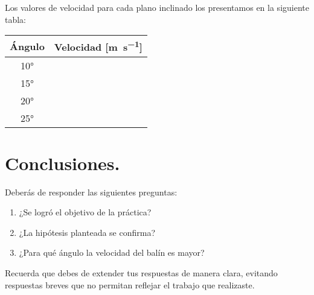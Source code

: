 \documentclass[14pt]{extarticle}
\begin{document}
Los valores de velocidad para cada plano inclinado los presentamos en la siguiente tabla:
\begin{table}[H]
    \centering
    \begin{tabular}{| c | c |} \hline
        Ángulo & Velocidad [\unit{\meter\per\second}] \\ \hline
        \ang{10} & \\ \hline
        \ang{15} & \\ \hline
        \ang{20} & \\ \hline
        \ang{25} & \\ \hline        
    \end{tabular}
\end{table}

\section{Conclusiones.}

Deberás de responder las siguientes preguntas:
\begin{enumerate}
\item ¿Se logró el objetivo de la práctica?
\item ¿La hipótesis planteada se confirma?
\item ¿Para qué ángulo la velocidad del balín es mayor?
\end{enumerate}
Recuerda que debes de extender tus respuestas de manera clara, evitando respuestas breves que no permitan reflejar el trabajo que realizaste.
\end{document}
